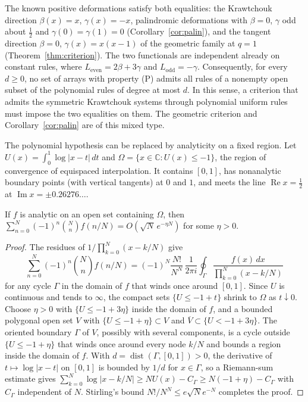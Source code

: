 The known positive deformations satisfy both equalities: the Krawtchouk direction $\beta(x)=x$, $\gamma(x)=-x$, palindromic deformations with $\beta=0$, $\gamma$ odd about $\tfrac12$ and $\gamma(0)=\gamma(1)=0$ (Corollary~\ref{cor:palin}), and the tangent direction $\beta=0$, $\gamma(x)=x(x-1)$ of the geometric family at $q=1$ (Theorem~\ref{thm:criterion}). The two functionals are independent already on constant rules, where $L_{\mathrm{even}}=2\beta+3\gamma$ and $L_{\mathrm{odd}}=-\gamma$. Consequently, for every $d\geq0$, no set of arrays with property (P) admits all rules of a nonempty open subset of the polynomial rules of degree at most $d$. In this sense, a criterion that admits the symmetric Krawtchouk systems through polynomial uniform rules must impose the two equalities on them. The geometric criterion and Corollary~\ref{cor:palin} are of this mixed type.

The polynomial hypothesis can be replaced by analyticity on a fixed region. Let $U(x)=\int_0^1\log|x-t|\,dt$ and $\Omega=\{x\in\mathbb C:U(x)\leq-1\}$, the region of convergence of equispaced interpolation. It contains $[0,1]$, has nonanalytic boundary points (with vertical tangents) at $0$ and $1$, and meets the line $\operatorname{Re}x=\tfrac12$ at $\operatorname{Im}x=\pm0.26276\ldots$.

\begin{lemma}\label{lem:nr}
If $f$ is analytic on an open set containing $\Omega$, then $\sum_{n=0}^N(-1)^n\binom Nnf(n/N)=O(\sqrt N\,e^{-\eta N})$ for some $\eta>0$.
\end{lemma}
\begin{proof}
The residues of $1/\prod_{k=0}^N(x-k/N)$ give
\[
\sum_{n=0}^N(-1)^n\binom Nnf(n/N)=(-1)^N\frac{N!}{N^N}\,\frac1{2\pi i}\oint_\Gamma\frac{f(x)\,dx}{\prod_{k=0}^N(x-k/N)}
\]
for any cycle $\Gamma$ in the domain of $f$ that winds once around $[0,1]$. Since $U$ is continuous and tends to $\infty$, the compact sets $\{U\leq-1+t\}$ shrink to $\Omega$ as $t\downarrow0$. Choose $\eta>0$ with $\{U\leq-1+3\eta\}$ inside the domain of $f$, and a bounded polygonal open set $V$ with $\{U\leq-1+\eta\}\subset V$ and $\overline V\subset\{U<-1+3\eta\}$. The oriented boundary $\Gamma$ of $V$, possibly with several components, is a cycle outside $\{U\leq-1+\eta\}$ that winds once around every node $k/N$ and bounds a region inside the domain of $f$. With $d=\operatorname{dist}(\Gamma,[0,1])>0$, the derivative of $t\mapsto\log|x-t|$ on $[0,1]$ is bounded by $1/d$ for $x\in\Gamma$, so a Riemann-sum estimate gives $\sum_{k=0}^N\log|x-k/N|\geq NU(x)-C_\Gamma\geq N(-1+\eta)-C_\Gamma$ with $C_\Gamma$ independent of $N$. Stirling's bound $N!/N^N\leq e\sqrt Ne^{-N}$ completes the proof.
\end{proof}

